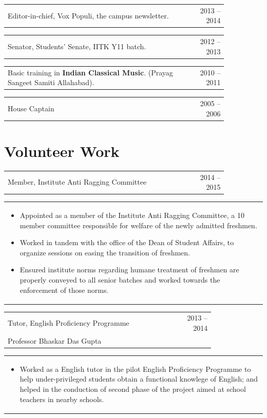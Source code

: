 \documentclass[a4paper,10pt]{article} %
\newcommand{\lproject}[4]{
    \begin{tabular}{p{0.80\linewidth}r}
        \textcolor{NavyBlue}{#2} & \multicolumn{1}{m{4cm}}{\raggedleft \textsc{#1}}\\
        #3
    \end{tabular}
    \begin{tabular}{p{\linewidth}}
    \vspace{-0.3cm}
        \footnotesize{#4}
    \end{tabular}
    \vspace{-0.5cm}
}
\newcommand{\iproject}[3]{
    \begin{tabular}{p{0.85\linewidth}r}
        \textcolor{NavyBlue}{#2} & \multicolumn{1}{m{3cm}}{\raggedleft \textsc{#1}}\\
    \end{tabular}
    \begin{tabular}{p{\linewidth}}
    \vspace{-0.3cm}
        \footnotesize{#3}
    \end{tabular}
    \vspace{-0.5cm}
}
\newcommand{\skill}[2]{
    \begin{tabular}{p{0.85\linewidth}r}
        #2 & \multicolumn{1}{m{3cm}}{\raggedleft \textsc{#1}}\\
    \end{tabular}
    \vspace{-0.5cm}
}
\begin{document}
\skill {2013 -- 2014}
       {Editor-in-chief, Vox Populi, the campus newsletter.}

\skill {2012 -- 2013}
       {Senator, Students' Senate, IITK Y11 batch.}

\skill {2010 -- 2011}
       {Basic training in \textbf{Indian Classical Music}. (Prayag Sangeet Samiti Allahabad).}

\skill {2005 -- 2006}
       {House Captain}


\section{Volunteer Work}

\iproject {2014 -- 2015}
          {Member, Institute Anti Ragging Committee}
          {
               \begin{itemize}[leftmargin=0.5cm]
                   \item Appointed as a member of the Institute Anti Ragging Committee, a 10 member committee responsible
                       for welfare of the newly admitted freshmen.
                   \item Worked in tandem with the office of the Dean of Student Affairs, to organize sessions
                       on easing the transition of freshmen.
                   \item Ensured institute norms regarding humane treatment of freshmen are properly conveyed to all senior batches
                       and worked towards the enforcement of those norms.
               \end{itemize}
          }

\lproject {2013 -- 2014}
          {Tutor, English Proficiency Programme}
          {Professor Bhaskar Das Gupta}
          {
               \begin{itemize}[leftmargin=0.5cm]
                   \item Worked as a English tutor in the pilot English Proficiency Programme to help
                       under-privileged students obtain a functional knowlege of English; and helped in the
                       conduction of second phase of the project aimed at school teachers in nearby schools.
               \end{itemize}
          }
\end{document}
